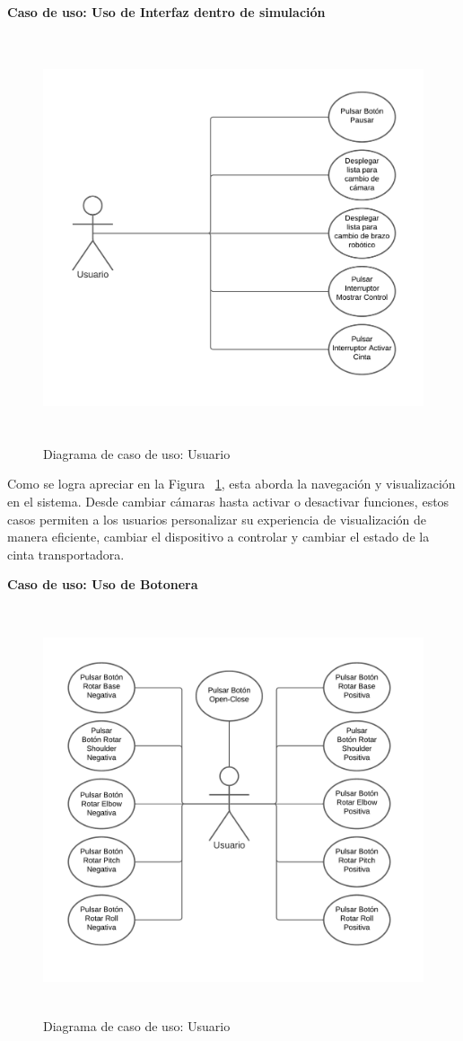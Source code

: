 \textbf{Caso de uso: Uso de Interfaz dentro de simulación}
\begin{figure}[h]
\centering
\includegraphics[width=13cm, height=12cm]{figures/cuuisimulacion.png}
\caption{Diagrama de caso de uso: Usuario}
\label{fig:cuuisimulacion}
\end{figure}

Como se logra apreciar en la Figura ~\ref{fig:cuuisimulacion}, esta aborda la navegación y visualización en el sistema. Desde cambiar cámaras hasta activar o desactivar funciones, estos casos permiten a los usuarios personalizar su experiencia de visualización de manera eficiente, cambiar el dispositivo a controlar y cambiar el estado de la cinta transportadora.

\clearpage
\textbf{Caso de uso: Uso de Botonera}
\begin{figure}[h]
\centering
\includegraphics[width=13cm, height=12cm]{figures/cubotonera.png}
\caption{Diagrama de caso de uso: Usuario}
\label{fig:cubotonera}
\end{figure}


